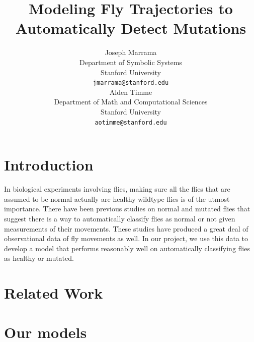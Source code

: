 \documentclass{article} %
\title{Modeling Fly Trajectories to Automatically Detect Mutations}
\author{
Joseph Marrama \\
Department of Symbolic Systems\\
Stanford University\\
\texttt{jmarrama@stanford.edu} \\
\And
Alden Timme \\
Department of Math and Computational Sciences \\
Stanford University \\
\texttt{aotimme@stanford.edu} \\
}
\begin{document}
\maketitle




\section{Introduction}

In biological experiments involving flies, making sure all the flies that are assumed to be normal actually are healthy wildtype flies is of the utmost importance. There have been previous studies on normal and mutated flies that suggest there is a way to automatically classify flies as normal or not given measurements of their movements. These studies have produced a great deal of observational data of fly movements as well. In our project, we use this data to develop a model that performs reasonably well on automatically classifying flies as healthy or mutated.


\section{Related Work}


\section{Our models}

\end{document}
